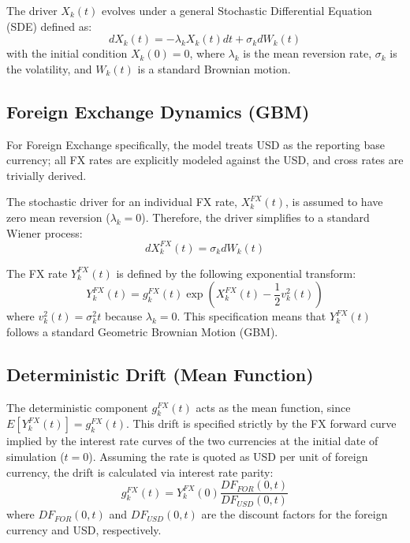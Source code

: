 The driver $X_k(t)$ evolves under a general Stochastic Differential Equation (SDE) defined as:
\begin{equation}
	dX_k(t) = -\lambda_k X_k(t)dt + \sigma_k dW_k(t)
\end{equation}
with the initial condition $X_k(0) = 0$, where $\lambda_k$ is the mean reversion rate, $\sigma_k$ is the volatility, and $W_k(t)$ is a standard Brownian motion.

\subsection*{Foreign Exchange Dynamics (GBM)}
For Foreign Exchange specifically, the model treats USD as the reporting base currency; all FX rates are explicitly modeled against the USD, and cross rates are trivially derived.

The stochastic driver for an individual FX rate, $X_k^{FX}(t)$, is assumed to have zero mean reversion ($\lambda_k = 0$). Therefore, the driver simplifies to a standard Wiener process:
\begin{equation}
	dX_k^{FX}(t) = \sigma_k dW_k(t)
\end{equation}

The FX rate $Y_k^{FX}(t)$ is defined by the following exponential transform:
\begin{equation}
	Y_k^{FX}(t) = g_k^{FX}(t) \exp\left(X_k^{FX}(t) - \frac{1}{2}v_k^2(t)\right)
\end{equation}
where $v_k^2(t) = \sigma_k^2 t$ because $\lambda_k = 0$. This specification means that $Y_k^{FX}(t)$ follows a standard Geometric Brownian Motion (GBM).

\subsection*{Deterministic Drift (Mean Function)}
The deterministic component $g_k^{FX}(t)$ acts as the mean function, since $E[Y_k^{FX}(t)] = g_k^{FX}(t)$. This drift is specified strictly by the FX forward curve implied by the interest rate curves of the two currencies at the initial date of simulation ($t=0$). Assuming the rate is quoted as USD per unit of foreign currency, the drift is calculated via interest rate parity:
\begin{equation}
	g_k^{FX}(t) = Y_k^{FX}(0) \frac{DF_{FOR}(0,t)}{DF_{USD}(0,t)}
\end{equation}
where $DF_{FOR}(0,t)$ and $DF_{USD}(0,t)$ are the discount factors for the foreign currency and USD, respectively.

